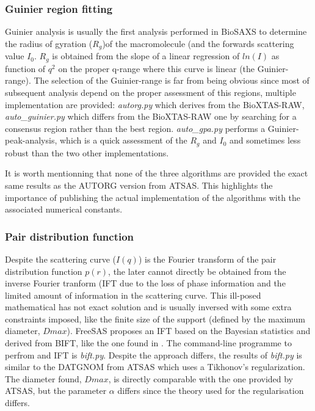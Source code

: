 \documentclass[preprint]{iucr}              %
\begin{document}
\subsubsection{Guinier region fitting}
Guinier analysis \cite{guinier} is usually the first analysis performed in BioSAXS to determine the radius of gyration ($R_g$)of the macromolecule (and the forwards scattering value $I_0$.
$R_g$ is obtained from the slope of a linear regression of $ln(I)$ as function of $q^2$ on the proper q-range where this curve is linear (the Guinier-range).
The selection of the Guinier-range is far from being obvious since most of subsequent analysis depend on the proper assessment of this regions, 
multiple implementation are provided: \textit{autorg.py} which derives from the BioXTAS-RAW\cite{bioxtasraw}, \textit{auto_guinier.py} which differs from the BioXTAS-RAW
one by searching for a consensus region rather than the best region. 
\textit{auto_gpa.py} performs a Guinier-peak-analysis\cite{gpa}, which is a quick assessment of the $R_g$ and $I_0$ and sometimes less robust than the two other implementations. 

It is worth mentionning that none of the three algorithms are provided the exact same results as the AUTORG\cite{ATSAS2} version from ATSAS. 
This highlights the importance of publishing the actual implementation of the algorithms with the associated numerical constants.
  
\subsubsection{Pair distribution function}
Despite the scattering curve ($I(q)$) is the Fourier transform of the pair distribution function $p(r)$, the later cannot directly be obtained from the
inverse Fourier tranform (IFT due to the loss of phase information and the limited amount of information in the scattering curve. 
This ill-posed mathematical has not exact solution and is usually inversed with some extra constraints imposed, like the finite size of the support (defined by the maximum diameter, $Dmax$).    
FreeSAS proposes an IFT based on the Bayesian statistics and derived from BIFT\cite{bift}, like the one found in \cite{bioxtasraw}.
The command-line programme to perfrom and IFT is \textit{bift.py}. 
Despite the approach differs, the results of \textit{bift.py} is similar to the DATGNOM\cite{ATSAS1} from ATSAS which uses a Tikhonov's regularization.
The diameter found, $Dmax$, is directly comparable with the one provided by ATSAS, but the parameter $\alpha$ differs since the theory used for the regularisation differs. 
\end{document}
